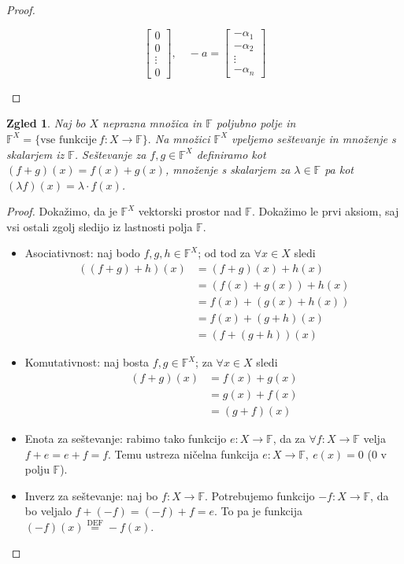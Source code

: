 \documentclass[10pt, a4paper]{article}
\newtheorem{zgled}{Zgled}[section]
\newenvironment{noticeC}{%
  \tcolorbox[%
  notitle,
  empty,
  enhanced,  %
  breakable,
  coltext=black, 
  fontupper=\rmfamily,
  parbox=false,
  noparskip,
  sharp corners,
  boxrule=-1pt,  %
  frame hidden,
  left=7pt,  %
  right=7pt,
  top=5pt,
  bottom=5pt,
  before skip=2.5ex plus 2pt,
  after skip=2.5ex plus 2pt,
  overlay unbroken and last={%
  },
  ]}
{\endtcolorbox}
\newenvironment{dokaz}%
  {\begin{noticeC}\begin{proof}}%
  {\end{proof}\end{noticeC}}
\newcommand{\F}{\mathbb {F}}
\begin{document}
\begin{dokaz}
\begin{enumerate}
$$\begin{bmatrix}
                0\\ 0\\ \vdots \\ 0
            \end{bmatrix}, \quad
            -a=\begin{bmatrix}
                -\alpha_1\\ -\alpha_2\\ \vdots \\ -\alpha_n \end{bmatrix}$$ \qedhere
        \end{enumerate} 
    \end{dokaz}


\begin{zgled}
    Naj bo $X$ neprazna množica in $\F$ poljubno polje in 
    $\F^X = \{\text{vse funkcije}\ f:X \rightarrow \F\}.$
    Na množici $\F^X$ vpeljemo seštevanje in množenje s skalarjem iz $\F$.
    Seštevanje za $f,g \in \F^X$ definiramo kot
    $(f+g)(x) = f(x) + g(x)$,
    množenje s skalarjem za $\lambda \in \F$ pa kot
    $(\lambda f)(x) = \lambda \cdot f(x)$.
\end{zgled}
    

    \begin{dokaz}
        Dokažimo, da je $\F^X$ vektorski prostor nad $\F$.
        Dokažimo le prvi aksiom, saj vsi ostali zgolj sledijo iz lastnosti polja $\F$.
        \label{eq6}
        \begin{itemize}
            \item Asociativnost: naj bodo $f,g,h \in \F^X$; od tod za $\forall x \in X$ sledi
            \begin{align*}
                ((f+g)+h)(x) &= (f+g)(x) + h(x)\\
                &= (f(x) + g(x)) + h(x)\\
                &= f(x) + (g(x) + h(x))\\
                &= f(x) + (g+h)(x)\\
                &= (f+(g+h))(x) 
            \end{align*}
            \item Komutativnost: naj bosta $f,g \in \F^X$; za $\forall x \in X$ sledi
            \begin{align*}
                (f+g)(x) &= f(x) + g(x)\\
                &= g(x) + f(x)\\
                &= (g+f)(x)
            \end{align*}
            \item Enota za seštevanje: rabimo tako funkcijo $e: X \rightarrow \F$, da za $\forall f: X \rightarrow \F$ velja
            $f+e = e + f = f$. Temu ustreza ničelna funkcija
            $e:X \rightarrow \F,\ e(x) = 0$ ($0$ v polju $\F$).
            \item Inverz za seštevanje: naj bo $f: X \rightarrow \F$. Potrebujemo funkcijo $-f:X \rightarrow \F$, da bo veljalo $f + (-f) = (-f) + f = e$. To pa je funkcija
            $(-f)(x) \stackrel{\text{DEF}}{=} -f(x)$. \qedhere
        \end{itemize}
    \end{dokaz}
\end{document}
